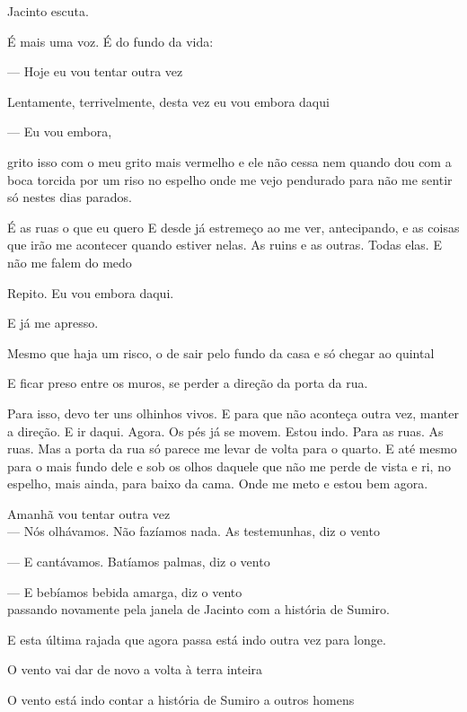 Jacinto escuta.

É mais uma voz. É do fundo da vida:

--- Hoje eu vou tentar outra vez

Lentamente, terrivelmente, desta vez eu vou embora daqui

--- Eu vou embora,

grito isso com o meu grito mais vermelho e ele não cessa nem quando dou
com a boca torcida por um riso no espelho onde me vejo pendurado para
não me sentir só nestes dias parados.

É as ruas o que eu quero E desde já estremeço ao me ver, antecipando, e
as coisas que irão me acontecer quando estiver nelas. As ruins e as
outras. Todas elas. E não me falem do medo

Repito. Eu vou embora daqui.

E já me apresso.

Mesmo que haja um risco, o de sair pelo fundo da casa e só chegar ao
quintal

E ficar preso entre os muros, se perder a direção da porta da rua.

Para isso, devo ter uns olhinhos vivos. E para que não aconteça outra
vez, manter a direção. E ir daqui. Agora. Os pés já se movem. Estou
indo. Para as ruas. As ruas. Mas a porta da rua só parece me levar de
volta para o quarto. E até mesmo para o mais fundo dele e sob os olhos
daquele que não me perde de vista e ri, no espelho, mais ainda, para
baixo da cama. Onde me meto e estou bem agora.

Amanhã vou tentar outra vez\\

--- Nós olhávamos. Não fazíamos nada. As testemunhas, diz o vento

--- E cantávamos. Batíamos palmas, diz o vento

--- E bebíamos bebida amarga, diz o vento\\

passando novamente pela janela de Jacinto com a história de Sumiro.

E esta última rajada que agora passa está indo outra vez para longe.

O vento vai dar de novo a volta à terra inteira

O vento está indo contar a história de Sumiro a outros homens

\pagebreak

\clearpage
\thispagestyle{empty}

\movetooddpage

